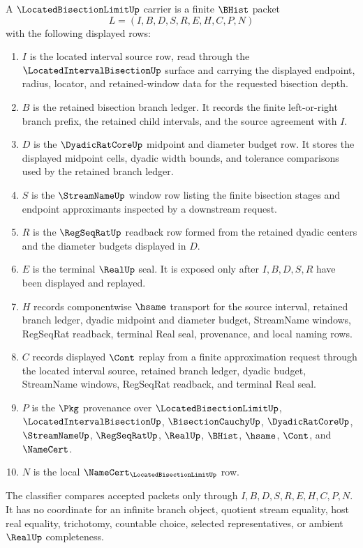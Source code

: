 \begin{definition}
\label{def:located-bisection-limit-carrier}
A $\LocatedBisectionLimitUp$ carrier is a finite $\BHist$ packet
$$
L=(I,B,D,S,R,E,H,C,P,N)
$$
with the following displayed rows:
\begin{enumerate}
\item $I$ is the located interval source row, read through the $\LocatedIntervalBisectionUp$ surface and carrying the displayed endpoint, radius, locator, and retained-window data for the requested bisection depth.
\item $B$ is the retained bisection branch ledger. It records the finite left-or-right branch prefix, the retained child intervals, and the source agreement with $I$.
\item $D$ is the $\DyadicRatCoreUp$ midpoint and diameter budget row. It stores the displayed midpoint cells, dyadic width bounds, and tolerance comparisons used by the retained branch ledger.
\item $S$ is the $\StreamNameUp$ window row listing the finite bisection stages and endpoint approximants inspected by a downstream request.
\item $R$ is the $\RegSeqRatUp$ readback row formed from the retained dyadic centers and the diameter budgets displayed in $D$.
\item $E$ is the terminal $\RealUp$ seal. It is exposed only after $I,B,D,S,R$ have been displayed and replayed.
\item $H$ records componentwise $\hsame$ transport for the source interval, retained branch ledger, dyadic midpoint and diameter budget, StreamName windows, RegSeqRat readback, terminal Real seal, provenance, and local naming rows.
\item $C$ records displayed $\Cont$ replay from a finite approximation request through the located interval source, retained branch ledger, dyadic budget, StreamName windows, RegSeqRat readback, and terminal Real seal.
\item $P$ is the $\Pkg$ provenance over $\LocatedBisectionLimitUp$, $\LocatedIntervalBisectionUp$, $\BisectionCauchyUp$, $\DyadicRatCoreUp$, $\StreamNameUp$, $\RegSeqRatUp$, $\RealUp$, $\BHist$, $\hsame$, $\Cont$, and $\NameCert$.
\item $N$ is the local $\NameCert_{\LocatedBisectionLimitUp}$ row.
\end{enumerate}
The classifier compares accepted packets only through $I,B,D,S,R,E,H,C,P,N$. It has no coordinate for an infinite branch object, quotient stream equality, host real equality, trichotomy, countable choice, selected representatives, or ambient $\RealUp$ completeness.
\end{definition}


